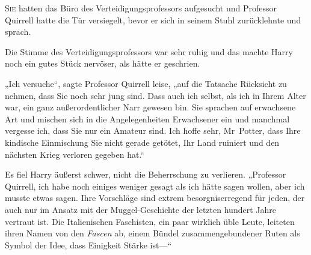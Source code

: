 
\lettrine{S}{ie} hatten das Büro des Verteidigungsprofessors aufgesucht und Professor Quirrell hatte die Tür versiegelt, bevor er sich in seinem Stuhl zurücklehnte und sprach.

Die Stimme des Verteidigungsprofessors war sehr ruhig und das machte Harry noch ein gutes Stück nervöser, als hätte er geschrien.

„Ich versuche“, sagte Professor Quirrell leise, „auf die Tatsache Rücksicht zu nehmen, dass Sie noch sehr jung sind. Dass auch ich selbst, als ich in Ihrem Alter war, ein ganz außerordentlicher Narr gewesen bin. Sie sprachen auf erwachsene Art und mischen sich in die Angelegenheiten Erwachsener ein und manchmal vergesse ich, dass Sie nur ein Amateur sind. Ich hoffe sehr, Mr~Potter, dass Ihre kindische Einmischung Sie nicht gerade getötet, Ihr Land ruiniert und den nächsten Krieg verloren gegeben hat.“

Es fiel Harry äußerst schwer, nicht die Beherrschung zu verlieren.
„Professor Quirrell, ich habe noch einiges weniger gesagt als ich hätte sagen wollen, aber ich musste etwas sagen. Ihre Vorschläge sind extrem besorgniserregend für jeden, der auch nur im Ansatz mit der Muggel-Geschichte der letzten hundert Jahre vertraut ist. Die Italienischen Faschisten, ein paar wirklich üble Leute, leiteten ihren Namen von den \emph{Fascen} ab, einem Bündel zusammengebundener Ruten als Symbol der Idee, dass Einigkeit Stärke ist—“

